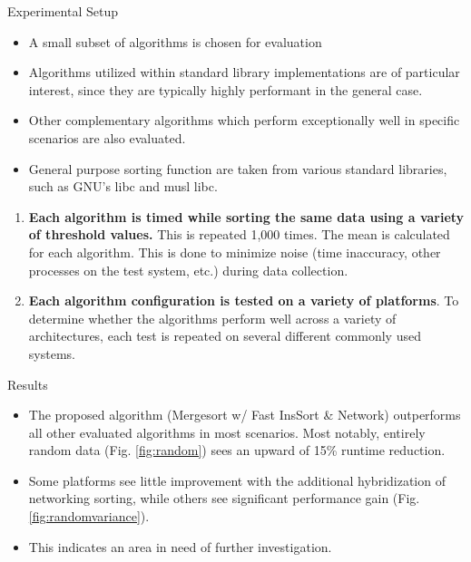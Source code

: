 \documentclass[final]{beamer}
\newlength{\colwidth}
\begin{document}
\begin{frame}[t]
\begin{columns}[t]
\begin{column}{\colwidth}
			\begin{block}{Experimental Setup}

				\begin{itemize}
					\item A small subset of algorithms is chosen for evaluation
					\item Algorithms utilized within standard library implementations are
					      of particular interest, since they are typically highly
					      performant in the general case.
					\item Other complementary algorithms which perform exceptionally well
					      in specific scenarios are also evaluated.
					\item General purpose sorting function are taken from various standard
					      libraries, such as GNU's libc\parencite{glibc} and musl
					      libc\parencite{musl_libc}.
				\end{itemize}
				\begin{enumerate}
					\item \textbf{Each algorithm is timed while sorting the same data
						      using a variety of threshold values.} This is repeated 1,000
					      times. The mean is calculated for each algorithm. This is done
					      to minimize noise (time inaccuracy, other processes on the test
					      system, etc.) during data collection.
					\item \textbf{Each algorithm configuration is tested on a variety of
						      platforms}. To determine whether the algorithms perform well
					      across a variety of architectures, each test is repeated on
					      several different commonly used systems.
				\end{enumerate}
			\end{block}

			\begin{block}{Results}
				\begin{itemize}
					\item The proposed algorithm (Mergesort w/ Fast InsSort \& Network)
					      outperforms all other evaluated algorithms in most scenarios.
					      Most notably, entirely random data (Fig. \ref{fig:random}) sees
					      an upward of 15\% runtime reduction.
					\item Some platforms see little improvement with the additional
					      hybridization of networking sorting, while others see
					      significant performance gain (Fig. \ref{fig:randomvariance}).
					\item This indicates an area in need of further investigation.
				\end{itemize}


\end{block}
\end{column}
\end{columns}
\end{frame}
\end{document}
